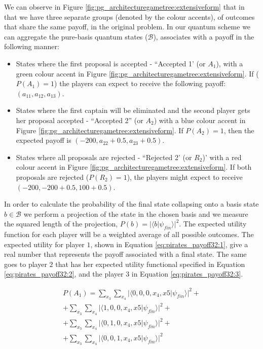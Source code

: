\documentclass[10pt,twocolumn]{llncs}
\begin{document}
We can observe in Figure \ref{fig:pg_architecturegametree:extensiveform} that in that we have three separate groups (denoted by the colour accents), of outcomes that share the same payoff, in the original problem. 
In our quantum scheme we can aggregate the pure-basis quantum states ($\mathcal{B}$), associates with a payoff in the following manner: 
\begin{itemize}
\item States where the first proposal is accepted - ``Accepted 1' (or $A_{1}$), with a green colour accent in Figure \ref{fig:pg_architecturegametree:extensiveform}. If ($P(A_{1})=1$) the players can expect to receive the following payoff: $(a_{11}, a_{12}, a_{13})$.

\item States where the first captain will be eliminated and the second player gets her proposal accepted  - ``Accepted 2'' (or $A_{2}$) with a blue colour accent in Figure \ref{fig:pg_architecturegametree:extensiveform}. If $P(A_{2})=1$, then the expected payoff is $(-200, a_{22}+0.5, a_{23}+0.5)$.

\item States where all proposals are rejected  - ``Rejected 2' (or $R_{2}$)' with a red colour accent in Figure \ref{fig:pg_architecturegametree:extensiveform}. If both proposals are rejected ($P(R_{2})= 1$), the players might expect to receive $(-200, -200+0.5, 100+0.5)$.

\end{itemize}

In order to calculate the probability of the final state collapsing onto a basis state $b \in \mathcal{B}$ we perform a projection of the state in the chosen basis and we measure the squared length of the projection, $P(b) = \vert\langle b\vert\psi_{fin}\rangle\vert^{2}$\cite{Trueblood}. The expected utility function for each player will be a weighted average of all possible outcomes. The expected utility for player $1$, shown in Equation \ref{eq:pirates_payoff32:1}, give a real number that represents the payoff associated with a final state. The same goes to player $2$ that has her expected utility functional specified in Equation \ref{eq:pirates_payoff32:2}, and the player $3$ in Equation \ref{eq:pirates_payoff32:3}.


\begin{equation}
\begin{split}
P(A_{1}) = \sum_{x_{3}}\sum_{x_{4}}\vert\langle0,0,0,x_{4},x{5}\vert\psi_{fin}\rangle\vert^{2} + \\  + \sum_{x_{3}}\sum_{x_{4}}\vert\langle1,0,0,x_{4},x{5}\vert\psi_{fin}\rangle\vert^{2} + \\ 
+ \sum_{x_{3}}\sum_{x_{4}}\vert\langle0,1,0,x_{4},x{5}\vert\psi_{fin}\rangle\vert^{2} + \\ 
+ \sum_{x_{3}}\sum_{x_{4}}\vert\langle0,0,1,x_{4},x{5}\vert\psi_{fin}\rangle\vert^{2}
\end{split}
\end{equation}
\end{document}
